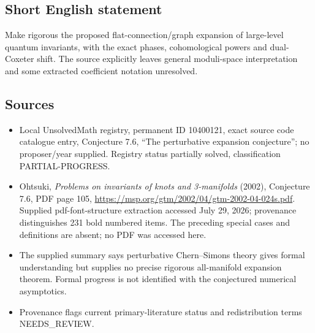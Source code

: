 \documentclass[11pt]{article}
\begin{document}
\subsection{Short English statement}
Make rigorous the proposed flat-connection/graph expansion of large-level quantum invariants, with the exact phases, cohomological powers and dual-Coxeter shift. The source explicitly leaves general moduli-space interpretation and some extracted coefficient notation unresolved.
\subsection{Sources}
\begin{itemize}
\item Local UnsolvedMath registry, permanent ID 10400121, exact source code catalogue entry, Conjecture 7.6, ``The perturbative expansion conjecture''; no proposer/year supplied. Registry status partially solved, classification PARTIAL-PROGRESS.
\item Ohtsuki, \emph{Problems on invariants of knots and 3-manifolds} (2002), Conjecture 7.6, PDF page 105, \url{https://msp.org/gtm/2002/04/gtm-2002-04-024s.pdf}. Supplied pdf-font-structure extraction accessed July 29, 2026; provenance distinguishes 231 bold numbered items. The preceding special cases and definitions are absent; no PDF was accessed here.
\item The supplied summary says perturbative Chern--Simons theory gives formal understanding but supplies no precise rigorous all-manifold expansion theorem. Formal progress is not identified with the conjectured numerical asymptotics.
\item Provenance flags current primary-literature status and redistribution terms NEEDS\_REVIEW.
\end{itemize}
\end{document}
